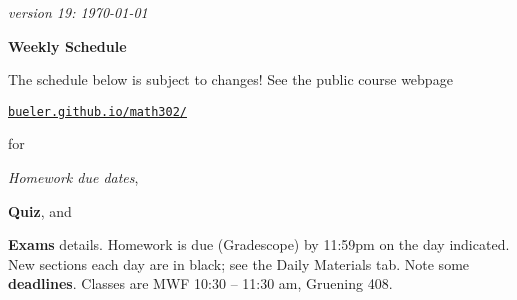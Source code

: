 \documentclass[12pt]{article}
\newcommand{\due}[1]{\strut {\color{BrickRed} \textsl{#1}}}
\newcommand{\ee}[1]{\strut {\color{Blue} \textbf{#1}}}
\newcommand{\dlinline}[1]{{\color{Purple} \textbf{#1}}}
\newcommand{\dl}[1]{{\small \dlinline{#1}}}
\begin{document}
\hfill \small \emph{version 19: \today} \normalsize

\bigskip\bigskip
\centerline{\Large \textbf{Weekly Schedule}}

\bigskip
The schedule below is subject to changes!  See the public course webpage

\medskip

\centerline{\href{https://bueler.github.io/math302/index.html}{\texttt{bueler.github.io/math302/}}}

\noindent for \due{Homework due dates}, \ee{Quiz}, and \ee{Exams} details.  Homework is due (Gradescope) by 11:59pm on the day indicated.  New sections each day are in black; see the Daily Materials tab.  Note some \dl{deadlines}.  Classes are MWF 10:30 -- 11:30 am, Gruening 408.

\bigskip
\end{document}

